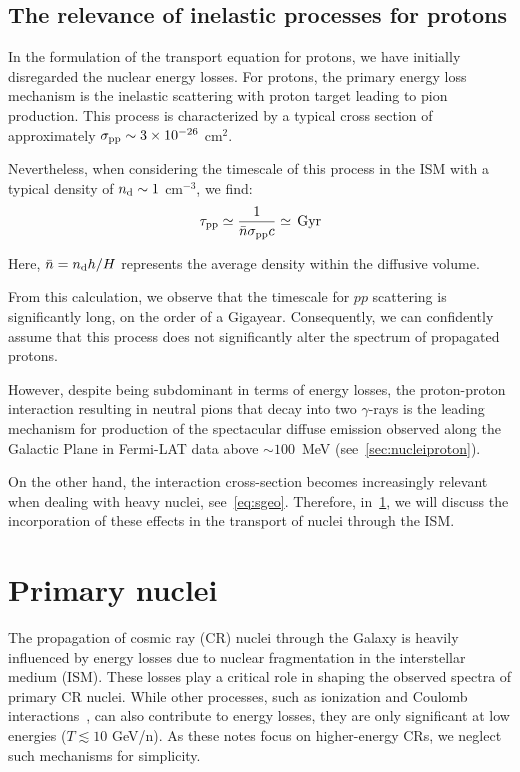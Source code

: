 \subsection{The relevance of inelastic processes for protons}

In the formulation of the transport equation for protons, we have initially disregarded the nuclear energy losses. For protons, the primary energy loss mechanism is the inelastic scattering with proton target leading to pion production. This process is characterized by a typical cross section of approximately $\sigma_{\rm pp}\sim 3\times 10^{-26}$ cm$^2$.

Nevertheless, when considering the timescale of this process in the ISM with a typical density of $n_{\rm d} \sim 1$ cm$^{-3}$, we find:
%
\begin{equation}
\tau_{\rm pp} \simeq \frac{1}{\bar{n}\sigma_{\rm pp}c} \simeq \, \text{Gyr}
\end{equation}

Here, $\bar{n} = n_{\rm d} h/H$ represents the average density within the diffusive volume.

From this calculation, we observe that the timescale for $pp$ scattering is significantly long, on the order of a Gigayear. Consequently, we can confidently assume that this process does not significantly alter the spectrum of propagated protons. 

However, despite being subdominant in terms of energy losses, the proton-proton interaction resulting in neutral pions that decay into two $\gamma$-rays is the leading mechanism for production of the spectacular diffuse emission observed along the Galactic Plane in Fermi-LAT data above $\sim 100$~MeV (see~\cref{sec:nucleiproton}).

On the other hand, the interaction cross-section becomes increasingly relevant when dealing with heavy nuclei, see~\cref{eq:sgeo}. Therefore, in~\cref{sec:nuclei}, we will discuss the incorporation of these effects in the transport of nuclei through the ISM.

\section{Primary nuclei}
\label{sec:nuclei}  

The propagation of cosmic ray (CR) nuclei through the Galaxy is heavily influenced by energy losses due to nuclear fragmentation in the interstellar medium (ISM). These losses play a critical role in shaping the observed spectra of primary CR nuclei. While other processes, such as ionization and Coulomb interactions~\cite{Serpicolecture}, can also contribute to energy losses, they are only significant at low energies (\(T \lesssim 10\) GeV/n). As these notes focus on higher-energy CRs, we neglect such mechanisms for simplicity.

